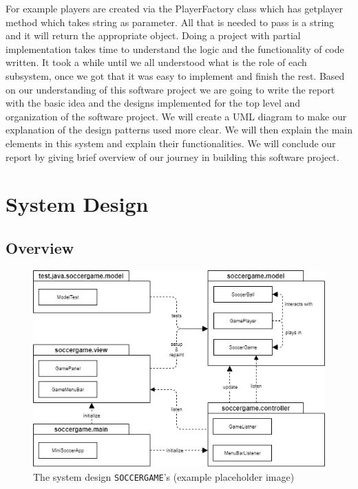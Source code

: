 \documentclass[12pt, dvipsnames, a4paper]{article}
\newcommand{\code}[1]{\texttt{#1}}
\begin{document}
For example players are created via the PlayerFactory class which has getplayer method
which takes string as parameter. All that is needed to pass is a string and it will
return the appropriate object. Doing a project with partial implementation takes time
to understand the logic and the functionality of code written. It took a while until
we all understood what is the role of each subsystem, once we got that it was easy to
implement and finish the rest. Based on our understanding of this software project we
are going to write the report with the basic idea and the designs implemented for the
top level and organization of the software project. We will create a UML diagram to make
our explanation of the design patterns used more clear. We will then explain the main
elements in this system and explain their functionalities. We will conclude our report
by giving brief overview of our journey in building this software project.

\section{System Design}
\subsection{Overview}
\begin{center}
	\begin{figure}[H]
		\hspace{50pt}
		\includegraphics[scale=0.6]{diagrams/system-diagram/system-diagram-pkg.png}
		\caption{The system design \code{SOCCERGAME}'s (example placeholder image)}
		\label{fig:systemdeisgn}
	\end{figure}
\end{center}
\clearpage
\end{document}
